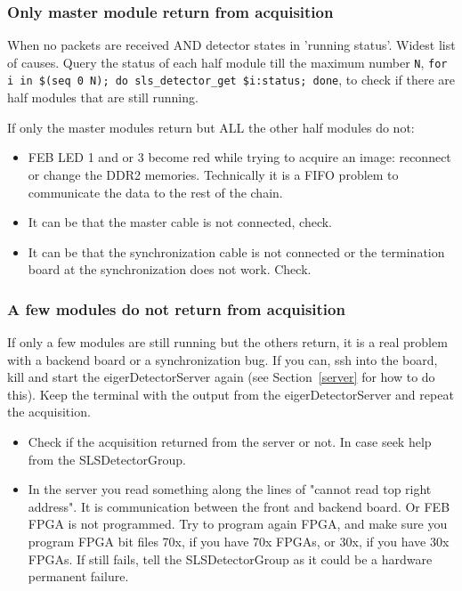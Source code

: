 \documentclass{article}
\begin{document}
\subsubsection{Only master module return from acquisition}
When no packets are received AND detector states in 'running status'. Widest list of causes. 
Query the status of each half module till the maximum number {\tt{N}},  {\tt{for i in \$(seq\ 0\ N); do sls\_detector\_get \$i:status; done}}, to check if there are half modules that are still running.

If only the master modules return but ALL the other half modules do not: 
\begin{itemize}
\item FEB LED 1 and or 3 become red while trying to acquire an image: reconnect or change the DDR2 memories. Technically it is a FIFO problem to communicate the data to the rest of the chain. 
\item It can be that the master cable is not connected, check.
\item It can be that the synchronization cable is not connected or the termination board at the synchronization does not work. Check.
\end{itemize}

\subsubsection{A few modules do not return from acquisition}
If only a few modules are still running but the others return, it is a real problem with a backend board or a synchronization bug.
If you can, ssh into the board, kill and start the eigerDetectorServer again (see Section~\ref{server} for how to do this). Keep the terminal with the output from the  eigerDetectorServer and repeat the acquisition. 
\begin{itemize}
\item Check if the acquisition returned from the server or not. In case seek help from the SLSDetectorGroup.
\item In the server you read something along the lines of "cannot read top right address". It is communication between the front and backend board. Or FEB FPGA is not programmed. Try to program again FPGA, and make sure you program FPGA bit files 70x, if you have 70x FPGAs, or 30x, if you have 30x FPGAs. If still fails, tell the SLSDetectorGroup as it could be a hardware permanent failure.
\end{itemize}
\end{document}
